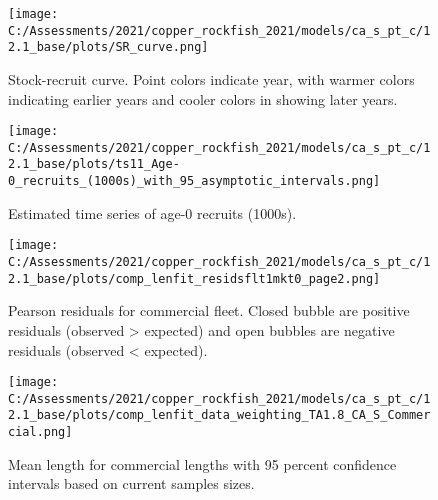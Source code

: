 \documentclass[11pt,
  english,
  a4paper,
]{article}
\begin{document}
\tagmcend\tagstructend


\begin{figure}
\centering
\texttt{[image: C:/Assessments/2021/copper\_rockfish\_2021/models/ca\_s\_pt\_c/12.1\_base/plots/SR\_curve.png]}
\caption{Stock-recruit curve. Point colors indicate year, with warmer colors indicating earlier years and cooler colors in showing later years.\label{fig:bh-curve}}
\end{figure}

\tagmcend\tagstructend


\begin{figure}
\centering
\texttt{[image: C:/Assessments/2021/copper\_rockfish\_2021/models/ca\_s\_pt\_c/12.1\_base/plots/ts11\_Age-0\_recruits\_(1000s)\_with\_95\_asymptotic\_intervals.png]}
\caption{Estimated time series of age-0 recruits (1000s).\label{fig:recruits}}
\end{figure}

\tagmcend\tagstructend


\begin{figure}
\centering
\texttt{[image: C:/Assessments/2021/copper\_rockfish\_2021/models/ca\_s\_pt\_c/12.1\_base/plots/comp\_lenfit\_residsflt1mkt0\_page2.png]}
\caption{Pearson residuals for commercial fleet. Closed bubble are positive residuals (observed \textgreater{} expected) and open bubbles are negative residuals (observed \textless{} expected).\label{fig:com-pearson}}
\end{figure}

\tagmcend\tagstructend


\begin{figure}
\centering
\texttt{[image: C:/Assessments/2021/copper\_rockfish\_2021/models/ca\_s\_pt\_c/12.1\_base/plots/comp\_lenfit\_data\_weighting\_TA1.8\_CA\_S\_Commercial.png]}
\caption{Mean length for commercial lengths with 95 percent confidence intervals based on current samples sizes.\label{fig:com-mean-len-fit}}
\end{figure}
\end{document}
